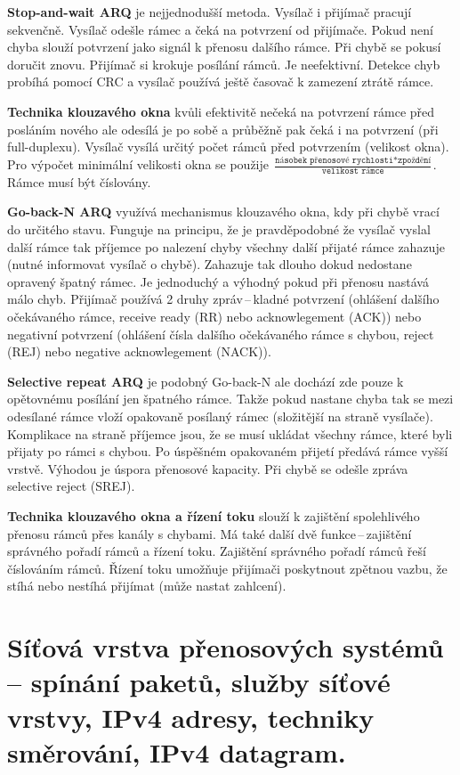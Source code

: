 \textbf{Stop-and-wait ARQ} je nejjednodušší metoda. Vysílač i přijímač pracují sekvenčně. Vysílač odešle rámec a čeká na potvrzení od přijímače. Pokud není chyba slouží potvrzení jako signál k přenosu dalšího rámce. Při chybě se pokusí doručit znovu. Přijímač si krokuje posílání rámců. Je neefektivní. Detekce chyb probíhá pomocí CRC a vysílač používá ještě časovač k zamezení ztrátě rámce.

\textbf{Technika klouzavého okna} kvůli efektivitě nečeká na potvrzení rámce před posláním nového ale odesílá je po sobě a průběžně pak čeká i na potvrzení (při full-duplexu). Vysílač vysílá určitý počet rámců před potvrzením (velikost okna). Pro výpočet minimální velikosti okna se použije \(\frac{\texttt{násobek přenosové rychlosti}*\texttt{zpoždění}}{\texttt{velikost rámce}}\). Rámce musí být číslovány.

\textbf{Go-back-N ARQ} využívá mechanismus klouzavého okna, kdy při chybě vrací do určitého stavu. Funguje na principu, že je pravděpodobné že vysílač vyslal další rámce tak příjemce po nalezení chyby všechny další přijaté rámce zahazuje (nutné informovat vysílač o chybě). Zahazuje tak dlouho dokud nedostane opravený špatný rámec. Je jednoduchý a výhodný pokud při přenosu nastává málo chyb. Přijímač používá 2 druhy zpráv\,--\,kladné potvrzení (ohlášení dalšího očekávaného rámce, receive ready (RR) nebo acknowlegement (ACK)) nebo negativní potvrzení (ohlášení čísla dalšího očekávaného rámce s chybou, reject (REJ) nebo negative acknowlegement (NACK)).

\textbf{Selective repeat ARQ} je podobný Go-back-N ale dochází zde pouze k opětovnému posílání jen špatného rámce. Takže pokud nastane chyba tak se mezi odesílané rámce vloží opakovaně posílaný rámec (složitější na straně vysílače). Komplikace na straně příjemce jsou, že se musí ukládat všechny rámce, které byli přijaty po rámci s chybou. Po úspěšném opakovaném přijetí předává rámce vyšší vrstvě. Výhodou je úspora přenosové kapacity. Při chybě se odešle zpráva selective reject (SREJ).

\textbf{Technika klouzavého okna a řízení toku} slouží k zajištění spolehlivého přenosu rámců přes kanály s chybami. Má také další dvě funkce\,--\,zajištění správného pořadí rámců a řízení toku. Zajištění správného pořadí rámců řeší číslováním rámců. Řízení toku umožňuje přijímači poskytnout zpětnou vazbu, že stíhá nebo nestíhá přijímat (může nastat zahlcení).


\clearpage
\section{Síťová vrstva přenosových systémů -- spínání paketů, služby síťové vrstvy, IPv4 adresy, techniky směrování, IPv4 datagram.}

